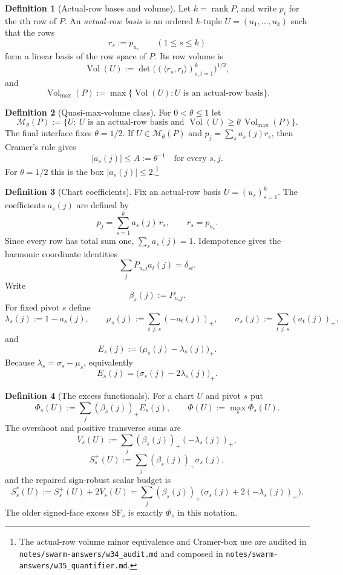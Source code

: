 \documentclass[11pt]{article}
\theoremstyle{plain}
\theoremstyle{definition}
\newtheorem{definition}{Definition}
\theoremstyle{remark}
\newcommand{\Vol}{\operatorname{Vol}}
\newcommand{\rank}{\operatorname{rank}}
\begin{document}
\begin{definition}[Actual-row bases and volume]\label{def:basis}
Let $k=\rank P$, and write $p_i$ for the $i$th row of $P$.  An
\emph{actual-row basis} is an ordered $k$-tuple
$U=(u_1,\ldots,u_k)$ such that the rows
\[
r_s:=p_{u_s}\qquad (1\le s\le k)
\]
form a linear basis of the row space of $P$.  Its row volume is
\[
\Vol(U):=\det\bigl((\langle r_s,r_t\rangle)_{s,t=1}^k\bigr)^{1/2},
\]
and
\[
\Vol_{\max}(P):=\max\{\Vol(U): U\text{ is an actual-row basis}\}.
\]
\end{definition}

\begin{definition}[Quasi-max-volume class]\label{def:theta}
For $0<\theta\le1$ let
\[
\mathcal M_\theta(P):=\{U:\ U\text{ is an actual-row basis and }
\Vol(U)\ge\theta\,\Vol_{\max}(P)\}.
\]
The final interface fixes $\theta=1/2$.  If $U\in\mathcal M_\theta(P)$ and
$p_j=\sum_s a_s(j)r_s$, then Cramer's rule gives
\[
|a_s(j)|\le A:=\theta^{-1}\quad\text{for every }s,j.
\]
For $\theta=1/2$ this is the box $|a_s(j)|\le2$.\footnote{The actual-row volume
minor equivalence and Cramer-box use are audited in
\texttt{notes/swarm-answers/w34\_audit.md} and composed in
\texttt{notes/swarm-answers/w35\_quantifier.md}.}
\end{definition}

\begin{definition}[Chart coefficients]\label{def:coeff}
Fix an actual-row basis $U=(u_s)_{s=1}^k$.  The coefficients $a_s(j)$ are defined
by
\[
p_j=\sum_{s=1}^k a_s(j)\,r_s,\qquad r_s=p_{u_s}.
\]
Since every row has total sum one, $\sum_s a_s(j)=1$.  Idempotence gives the
harmonic coordinate identities
\[
\sum_j P_{u_sj}a_t(j)=\delta_{st}.
\]
Write
\[
\beta_s(j):=P_{u_sj}.
\]
For fixed pivot $s$ define
\[
\lambda_s(j):=1-a_s(j),\qquad
\mu_s(j):=\sum_{t\ne s}(-a_t(j))_+,\qquad
\sigma_s(j):=\sum_{t\ne s}(a_t(j))_+,
\]
and
\[
E_s(j):=\bigl(\mu_s(j)-\lambda_s(j)\bigr)_+.
\]
Because $\lambda_s=\sigma_s-\mu_s$, equivalently
\[
E_s(j)=\bigl(\sigma_s(j)-2\lambda_s(j)\bigr)_+.
\]
\end{definition}

\begin{definition}[The excess functionals]\label{def:excess}
For a chart $U$ and pivot $s$ put
\[
\Phi_s(U):=\sum_j(\beta_s(j))_+E_s(j),\qquad
\Phi(U):=\max_s\Phi_s(U).
\]
The overshoot and positive transverse sums are
\[
V_s(U):=\sum_j(\beta_s(j))_+(-\lambda_s(j))_+,
\]
\[
S^+_s(U):=\sum_j(\beta_s(j))_+\sigma_s(j),
\]
and the repaired sign-robust scalar budget is
\[
S^*_s(U):=S^+_s(U)+2V_s(U)
=\sum_j(\beta_s(j))_+
\bigl(\sigma_s(j)+2(-\lambda_s(j))_+\bigr).
\]
The older signed-face excess $\mathrm{SF}_s$ is exactly $\Phi_s$ in this
notation.
\end{definition}
\end{document}
